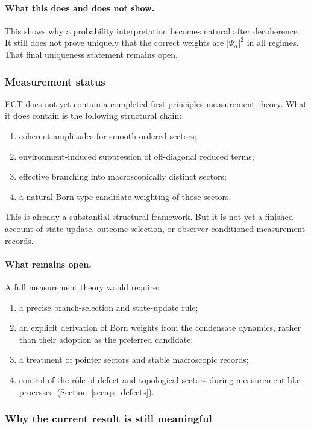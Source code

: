 \paragraph{What this does and does not show.}
This shows why a probability interpretation becomes natural after
decoherence.
It still does not prove uniquely that the correct weights are
$|\Psi_\alpha|^2$ in all regimes.
That final uniqueness statement remains open.

\subsubsection*{Measurement status}

ECT does not yet contain a completed first-principles measurement
theory.
What it does contain is the following structural chain:
\begin{enumerate}[label=(\roman*)]
  \item coherent amplitudes for smooth ordered sectors;
  \item environment-induced suppression of off-diagonal reduced terms;
  \item effective branching into macroscopically distinct sectors;
  \item a natural Born-type candidate weighting of those sectors.
\end{enumerate}
This is already a substantial structural framework.
But it is not yet a finished account of state-update, outcome
selection, or observer-conditioned measurement records.

\paragraph{What remains open.}
A full measurement theory would require:
\begin{enumerate}[label=(\roman*)]
  \item a precise branch-selection and state-update rule;
  \item an explicit derivation of Born weights from the condensate
    dynamics, rather than their adoption as the preferred candidate;
  \item a treatment of pointer sectors and stable macroscopic records;
  \item control of the r\^ole of defect and topological sectors during
    measurement-like processes~(Section~\ref{sec:qs_defects}).
\end{enumerate}

\subsubsection*{Why the current result is still meaningful}

